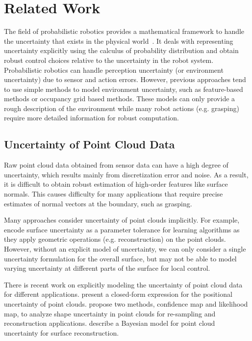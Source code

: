 \section{Related Work}
\label{sec:7:related}
The field of probabilistic robotics provides a mathematical framework to handle the uncertainty that exists
in the physical world~\cite{PR:2005}.  It deals with representing uncertainty explicitly using the calculus of probability distribution
and obtain robust control choices relative to the uncertainty in the robot system. Probabilistic robotics can handle perception uncertainty (or environment uncertainty) due to sensor and action errors. However, previous approaches tend to use simple methods to model environment uncertainty, such as feature-based methods or occupancy grid based methods. These models can only provide a rough description of the environment while many robot actions (e.g. grasping) require more detailed information for robust computation.

\subsection{Uncertainty of Point Cloud Data}
\label{sec:7:related:data}
Raw point cloud data obtained from sensor data can have a high degree of uncertainty, which results mainly from
discretization error and noise. As a result, it is difficult to obtain robust estimation of high-order features like surface normals. This causes difficulty for many applications that require precise estimates of normal vectors at the boundary, such as grasping.

Many approaches consider uncertainty of point clouds implicitly. For example, \cite{Steinke:2005,Bernhard:2005nips} encode surface uncertainty as a parameter tolerance for learning algorithms as they apply geometric operations (e.g. reconstruction) on the point clouds. However, without an explicit model of uncertainty, we can only consider a single uncertainty formulation for the overall surface, but may not be able to model varying uncertainty at different parts of the surface for local control.

There is recent work on explicitly modeling the uncertainty of  point cloud data for different applications. \cite{Bae:2009} present a closed-form expression for the positional uncertainty of point clouds. \cite{Pauly:2004} propose two methods, confidence map and likelihood map, to analyze shape uncertainty in
point clouds for re-sampling and reconstruction applications. \cite{Jenke:2006} describe a Bayesian model for point cloud uncertainty
for surface reconstruction.

